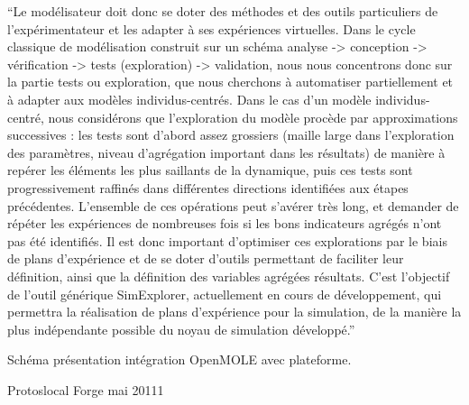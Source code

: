 \enquote{Le modélisateur doit donc se doter des méthodes et des outils particuliers de l’expérimentateur et les adapter à ses expériences virtuelles. Dans le cycle classique de modélisation construit sur un schéma analyse -> conception -> vérification -> tests (exploration) -> validation, nous nous concentrons donc sur la partie tests ou exploration, que nous cherchons à automatiser partiellement et à adapter aux modèles individus-centrés. Dans le cas d’un modèle individus-centré, nous considérons que l’exploration du modèle procède par approximations successives : les tests sont d’abord assez grossiers (maille large dans l’exploration des paramètres, niveau d’agrégation important dans les résultats) de manière à repérer les éléments les plus saillants de la dynamique, puis ces tests sont progressivement raffinés dans différentes directions identifiées aux étapes précédentes. L’ensemble de ces opérations peut s’avérer très long, et demander de répéter les expériences de nombreuses fois si les bons indicateurs agrégés n’ont pas été identifiés. Il est donc important d’optimiser ces explorations par le biais de plans d’expérience et de se doter d’outils permettant de faciliter leur définition, ainsi que la définition des variables agrégées résultats. C’est l’objectif de l’outil générique SimExplorer, actuellement en cours de développement, qui permettra la réalisation de plans d’expérience pour la simulation, de la manière la plus indépendante possible du noyau de simulation développé.}




Schéma présentation intégration OpenMOLE avec plateforme.

Protoslocal Forge mai 20111

